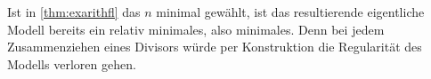 \begin{Bemerkung}\label{bem:konstruktionminmodell}
  Ist in \ref{thm:exarithfl} das $n$ minimal gewählt, ist das
  resultierende eigentliche Modell bereits ein relativ minimales, also
  minimales. Denn bei jedem Zusammenziehen eines Divisors würde per
  Konstruktion die Regularität des Modells verloren gehen.
\end{Bemerkung}

